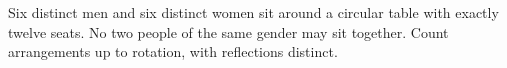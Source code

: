 Six distinct men and six distinct women sit around a circular table with exactly twelve seats. No two people of the same gender may sit together. Count arrangements up to rotation, with reflections distinct.
